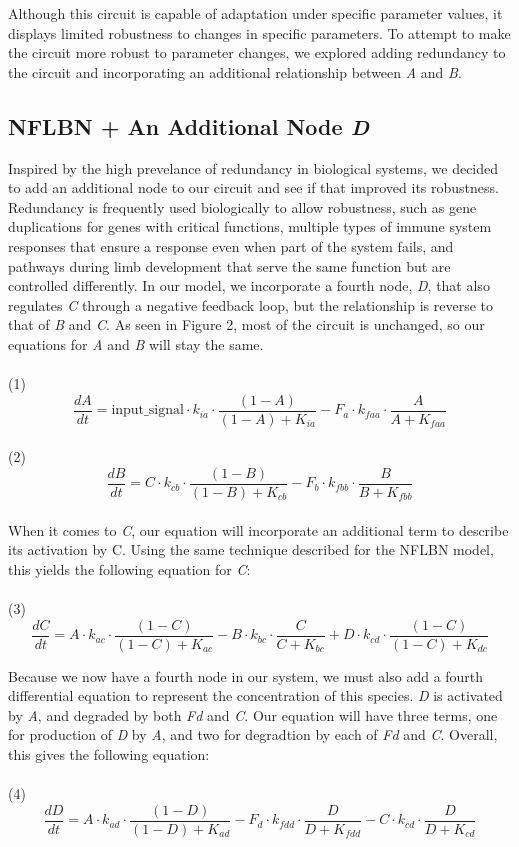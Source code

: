 \documentclass{article}
\begin{document}
Although this circuit is capable of adaptation under specific parameter values, it displays limited robustness to changes in specific parameters. To attempt to make the circuit more robust to parameter changes, we explored adding redundancy to the circuit and incorporating an additional relationship between \textit{A} and \textit{B}. 

\subsection{NFLBN + An Additional Node \textit{D}}

Inspired by the high prevelance of redundancy in biological systems, we decided to add an additional node to our circuit and see if that improved its robustness. Redundancy is frequently used biologically to allow robustness, such as gene duplications for genes with critical functions, multiple types of immune system responses that ensure a response even when part of the system fails, and pathways during limb development that serve the same function but are controlled differently. In our model, we incorporate a fourth node, \textit{D}, that also regulates \textit{C} through a negative feedback loop, but the relationship is reverse to that of \textit{B} and \textit{C}. As seen in Figure 2, most of the circuit is unchanged, so our equations for \textit{A} and \textit{B} will stay the same. 
\\
\\
(1)
\[
\frac{dA}{dt} = \text{input\_signal} \cdot k_{ia} \cdot \frac{(1 - A)}{(1 - A) + K_{ia}} - F_a \cdot k_{faa} \cdot \frac{A}{A + K_{faa}}
\]
\\
(2)
\[
\frac{dB}{dt} = C \cdot k_{cb} \cdot \frac{(1 - B)}{(1 - B) + K_{cb}} - F_b \cdot k_{fbb} \cdot \frac{B}{B + K_{fbb}}
\]
\\

When it comes to \textit{C}, our equation will incorporate an additional term to describe its activation by C. Using the same technique described for the NFLBN model, this yields the following equation for \textit{C}:
\\
\\
(3)
\[
\frac{dC}{dt} = A \cdot k_{ac} \cdot \frac{(1 - C)}{(1 - C) + K_{ac}} - B \cdot k_{bc} \cdot \frac{C}{C + K_{bc}} + D \cdot k_{cd} \cdot \frac{(1 - C)}{(1 - C) + K_{dc}}
\]

Because we now have a fourth node in our system, we must also add a fourth differential equation to represent the concentration of this species. \textit{D} is activated by \textit{A}, and degraded by both \textit{Fd} and \textit{C}. Our equation will have three terms, one for production of \textit{D} by \textit{A}, and two for degradtion by each of \textit{Fd} and \textit{C}. Overall, this gives the following equation:
\\
\\
(4)
\[
\frac{dD}{dt} = A \cdot k_{ad} \cdot \frac{(1 - D)}{(1 - D) + K_{ad}} - F_d \cdot k_{fdd} \cdot \frac{D}{D + K_{fdd}} - C \cdot k_{cd} \cdot \frac{D}{D + K_{cd}}
\]
\end{document}
